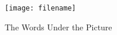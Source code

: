 \begin{figure}[h]
  \centering
  \texttt{[image: filename]} %
  \caption{The Words Under the Picture}
  \label{fig:a-cool-label-to-use-for-reference}
\end{figure}

